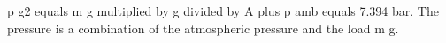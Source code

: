 p g2 equals m g multiplied by g divided by A plus p amb equals 7.394 bar.  
The pressure is a combination of the atmospheric pressure and the load m g.